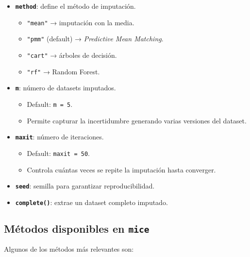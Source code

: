\documentclass[
]{book}
\providecommand{\tightlist}{%
  \setlength{\itemsep}{0pt}\setlength{\parskip}{0pt}}
\begin{document}
\begin{itemize}
\item
  \textbf{\texttt{method}}: define el método de imputación.

  \begin{itemize}
  \tightlist
  \item
    \texttt{"mean"} → imputación con la media.\\
  \item
    \texttt{"pmm"} (default) → \emph{Predictive Mean Matching}.\\
  \item
    \texttt{"cart"} → árboles de decisión.\\
  \item
    \texttt{"rf"} → Random Forest.
  \end{itemize}
\item
  \textbf{\texttt{m}}: número de datasets imputados.

  \begin{itemize}
  \tightlist
  \item
    Default: \texttt{m\ =\ 5}.\\
  \item
    Permite capturar la incertidumbre generando varias versiones del dataset.
  \end{itemize}
\item
  \textbf{\texttt{maxit}}: número de iteraciones.

  \begin{itemize}
  \tightlist
  \item
    Default: \texttt{maxit\ =\ 50}.\\
  \item
    Controla cuántas veces se repite la imputación hasta converger.
  \end{itemize}
\item
  \textbf{\texttt{seed}}: semilla para garantizar reproducibilidad.
\item
  \textbf{\texttt{complete()}}: extrae un dataset completo imputado.
\end{itemize}

\subsection{\texorpdfstring{Métodos disponibles en \texttt{mice}}{Métodos disponibles en mice}}\label{muxe9todos-disponibles-en-mice}

Algunos de los métodos más relevantes son:
\end{document}
